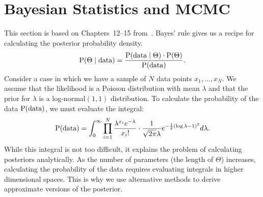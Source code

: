 \section{Bayesian Statistics and MCMC}
This section is based on Chapters~12--15 from~\cite{Lam}. Bayes' rule gives us a
 recipe for calculating the posterior probability density. 
\begin{equation}
	\operatorname{P} (\Theta \mid \text{data}) = 
	\frac{\operatorname{P} (\text{data} \mid \Theta) \cdot \operatorname{P} (\Theta)}{\operatorname{P} (\text{data})}.
\end{equation}
Consider a case in which we have a sample of $N$ data points $x_1, \ldots, x_N$. 
We assume that the likelihood is a Poisson distribution with mean $\lambda$ and 
that the prior for $\lambda$ is a log-normal$(1, 1)$ distribution. To calculate 
the probability of the data $\operatorname{P} (\text{data})$, we must evaluate the integral:
\begin{equation}
	\operatorname{P} (\text{data}) = \int_{0}^{\infty} 
		\prod_{i = 1}^N \frac{\lambda^{x_i} e^{- \lambda}}{x_i!} \cdot 
		\frac{1}{\sqrt{2 \pi} \lambda} e^{- \frac{1}{2} (\log \lambda - 1)^2} 
		d\lambda.
\end{equation}
While this integral is not too difficult, it explains the problem of calculating 
posteriors analytically. As the number of parameters (the length of $\Theta$) 
increases, calculating the probability of the data requires evaluating integrals 
in higher dimensional spaces. This is why we use alternative methods to derive 
approximate versions of the posterior.

